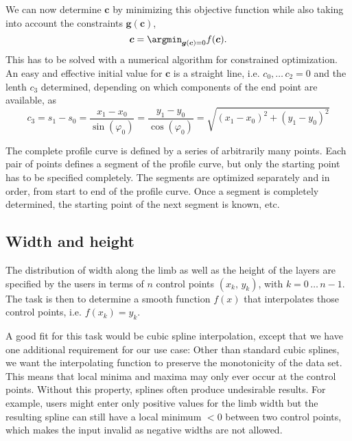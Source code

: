 %
We can now determine $\boldsymbol{c}$ by minimizing this objective function while also taking into account the constraints $\boldsymbol{g}(\boldsymbol{c})$,
%
\begin{equation}
\boldsymbol{c} = \argmin_{\boldsymbol{g}(\boldsymbol{c}) = 0} f(\boldsymbol{c}).
\end{equation}
%
This has to be solved with a numerical algorithm for constrained optimization.
An easy and effective initial value for $\boldsymbol{c}$ is a straight line, i.e. $c_0,\ldots\,c_2 = 0$ and the lenth $c_3$ determined, depending on which components of the end point are available, as
%
\begin{equation}
c_3 = s_1 - s_0 = \frac{x_1 - x_0}{\sin(\varphi_0)} = \frac{y_1 - y_0}{\cos(\varphi_0)} = \sqrt{(x_1 - x_0)^2 + (y_1 - y_0)^2}
\end{equation}
%

The complete profile curve is defined by a series of arbitrarily many points.
Each pair of points defines a segment of the profile curve, but only the starting point has to be specified completely.
The segments are optimized separately and in order, from start to end of the profile curve.
Once a segment is completely determined, the starting point of the next segment is known, etc.

\subsection{Width and height}

The distribution of width along the limb as well as the height of the layers are specified by the users in terms of $n$ control points $(x_k,\,y_k)$, with $k = 0\,\ldots\,n-1$.
The task is then to determine a smooth function $f(x)$ that interpolates those control points, i.e. $f(x_k) = y_k$.

A good fit for this task would be cubic spline interpolation, except that we have one additional requirement for our use case: Other than standard cubic splines, we want the interpolating function to preserve the monotonicity of the data set.
This means that local minima and maxima may only ever occur at the control points.
Without this property, splines often produce undesirable results.
For example, users might enter only positive values for the limb width but the resulting spline can still have a local minimum $< 0$ between two control points, which makes the input invalid as negative widths are not allowed.

